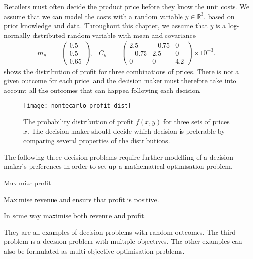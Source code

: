 \documentclass[main.tex]{subfiles}
\begin{document}
Retailers must often decide the product price before they know the
unit costs. We assume that we can model the costs with a random
variable $y\in\mathbb{R}^3$, based on prior knowledge and data.
Throughout this chapter, we  assume that $y$ is a log-normally
distributed random variable with mean and covariance
\begin{align}
  m_y
  &= \begin{pmatrix}0.5\\0.5\\0.65
  \end{pmatrix},
  &C_y
  &=\begin{pmatrix}
    2.5&-0.75&0\\
    -0.75&2.5&0\\
    0&0&4.2
  \end{pmatrix}
         \times 10^{-3}.
\end{align}
 shows the distribution of
profit for three combinations of prices. There is not a given outcome
for each price, and the decision maker must therefore take into
account all the outcomes that can happen following each decision.
\begin{figure}[htb]
  \centering
  \texttt{[image: montecarlo\_profit\_dist]}
  \caption[Probability distribution of profit]{The probability distribution of profit $f(x,y)$ for three
    sets of prices $x$.
    The decision maker should decide which decision is preferable by comparing
    several properties of the distributions.
  }\label{fig:example_profit_distributions}
\end{figure}

The following three decision problems require further modelling of a
decision maker's preferences in order to set up a mathematical
optimisation problem.
\begin{enumerate}
  \begin{samepage}
  \item Maximise profit.
  \item Maximise revenue and ensure that profit is positive.
  \item In some way maximise both revenue and profit.
  \end{samepage}
\end{enumerate}
They are all examples of decision problems with random outcomes.
The third problem is a decision problem with
multiple objectives. The other examples can also be
formulated as multi-objective optimisation problems.
\end{document}
